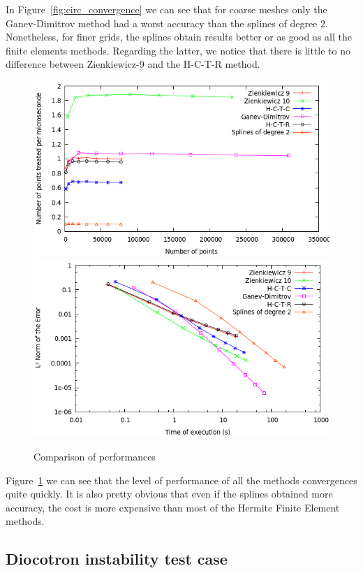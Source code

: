 \documentclass[proc]{edpsmath}
\begin{document}
In Figure~\ref{fig:circ_convergence} we can see that for coarse meshes only the Ganev-Dimitrov method had a worst accuracy than the splines of degree $2$. Nonetheless, for finer grids, the splines obtain results better or as good as all the finite elements methods. Regarding the latter, we notice that there is little to no difference between Zienkiewicz-9 and the H-C-T-R method. 

\begin{figure}[h!]
	\label{fig:circ_performance}
	\includegraphics[scale=0.35]{figures/efficiency.png}
	\includegraphics[scale=0.35]{figures/time_norm.png}
	\caption{Comparison of performances }
\end{figure}

Figure~\ref{fig:circ_performance} we can see that the level of performance of all the methods convergences quite quickly. It is also pretty obvious that even if the splines obtained more accuracy, the cost is more expensive than most of the Hermite Finite Element methods.

\subsection{Diocotron instability test case}
\end{document}
